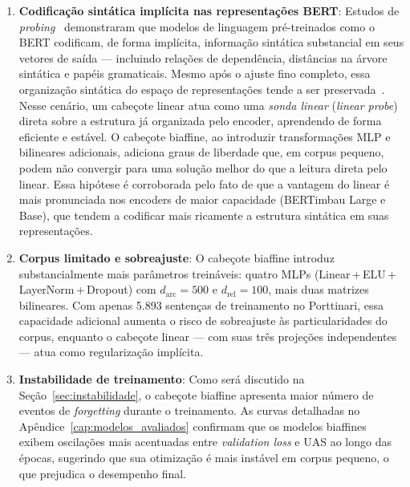 \begin{enumerate}
  \item \textbf{Codificação sintática implícita nas representações BERT}: Estudos de
        \textit{probing}~\citep{tenney2019bert,hewitt2019structural,jawahar2019does} demonstraram
        que modelos de linguagem pré-treinados como o BERT codificam, de forma implícita,
        informação sintática substancial em seus vetores de saída — incluindo relações de
        dependência, distâncias na árvore sintática e papéis gramaticais. Mesmo após o ajuste
        fino completo, essa organização sintática do espaço de representações tende a ser
        preservada~\citep{hewitt2019structural}. Nesse cenário, um cabeçote linear atua como
        uma \textit{sonda linear} (\textit{linear probe}) direta sobre a estrutura já organizada
        pelo encoder, aprendendo de forma eficiente e estável. O cabeçote biaffine, ao introduzir
        transformações MLP e bilineares adicionais, adiciona graus de liberdade que, em corpus
        pequeno, podem não convergir para uma solução melhor do que a leitura direta pelo linear.
        Essa hipótese é corroborada pelo fato de que a vantagem do linear é mais pronunciada
        nos encoders de maior capacidade (BERTimbau Large e Base), que tendem a codificar mais
        ricamente a estrutura sintática em suas representações.

  \item \textbf{Corpus limitado e sobreajuste}: O cabeçote biaffine introduz substancialmente
        mais parâmetros treináveis: quatro MLPs (Linear\,+\,ELU\,+\,LayerNorm\,+\,Dropout)
        com $d_\text{arc}=500$ e $d_\text{rel}=100$, mais duas matrizes bilineares. Com apenas
        5.893 sentenças de treinamento no Porttinari, essa capacidade adicional aumenta o risco
        de sobreajuste às particularidades do corpus, enquanto o cabeçote linear — com suas
        três projeções independentes — atua como regularização implícita.

  \item \textbf{Instabilidade de treinamento}: Como será discutido na Seção~\ref{sec:instabilidade},
        o cabeçote biaffine apresenta maior número de eventos de \textit{forgetting} durante o
        treinamento. As curvas detalhadas no Apêndice~\ref{cap:modelos_avaliados} confirmam que
        os modelos biaffines exibem oscilações mais acentuadas entre \textit{validation loss} e
        UAS ao longo das épocas, sugerindo que sua otimização é mais instável em corpus pequeno,
        o que prejudica o desempenho final.
\end{enumerate}

